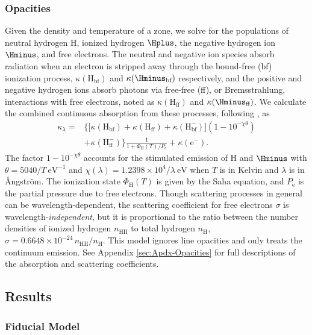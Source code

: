 \subsubsection{Opacities}
Given the density and temperature of a zone, we solve for the populations of neutral hydrogen H, ionized hydrogen $\Hplus$, the negative hydrogen ion $\Hminus$, and free electrons.
The neutral and negative ion species absorb radiation when an electron is stripped away through the bound-free (bf) ionization process, $\kappa(\text{H}_\text{bf})$ and $\kappa({\Hminus_\text{bf}})$ respectively, and the positive and negative hydrogen ions absorb photons via free-free (ff), or Bremsstrahlung, interactions with free electrons, noted as $\kappa (\text{H}_\text{ff})$ and $\kappa (\Hminus_\text{ff})$.
We calculate the combined continuous absorption from these processes, following \citet{Gray76,Gray21}, as
\begin{align}
	\kappa_\lambda =& \biggl\{ \bigl[ \kappa(\text{H}_\text{bf}) + \kappa(\text{H}_\text{ff}) + \kappa(\text{H}^-_\text{bf}) \bigr] (1 - 10^{-\chi \theta}) \nonumber \\
		    &+ \kappa(\text{H}^-_\text{ff}) \biggr\} \frac{1}{1 + \Phi_\text{H}(T) / P_\text{e}}  + \kappa(\text{e}^-).
\end{align}
The factor $1-10^{-\chi\theta}$ accounts for the stimulated emission of H and $\Hminus$ with $\theta = 5040 / T\ \text{eV}^{-1}$ and $\chi(\lambda) = 1.2398 \times 10^4 / \lambda\ \text{eV}$ when $T$ is in Kelvin and $\lambda$ is in \r{A}ngstr\"om.
The ionization state $\Phi_\text{H}(T)$ is given by the Saha equation, and $P_\text{e}$ is the partial pressure due to free electrons.
Though scattering processes in general can be wavelength-dependent, the scattering coefficient for free electrons $\sigma$ is wavelength-\emph{independent}, but it is proportional to the ratio between the number densities of ionized hydrogen $n_\text{HII}$ to total hydrogen $n_\text{H}$, $\sigma = 0.6648 \times 10^{-24} \,n_\text{HII} / n_\text{H}$.
This model ignores line opacities and only treats the continuum emission.
See Appendix \ref{sec:Apdx-Opacities} for full descriptions of the absorption and scattering coefficients.



\subsection{Results} \label{sec:results}

\subsubsection{Fiducial Model} \label{sec:fiducial-results}

